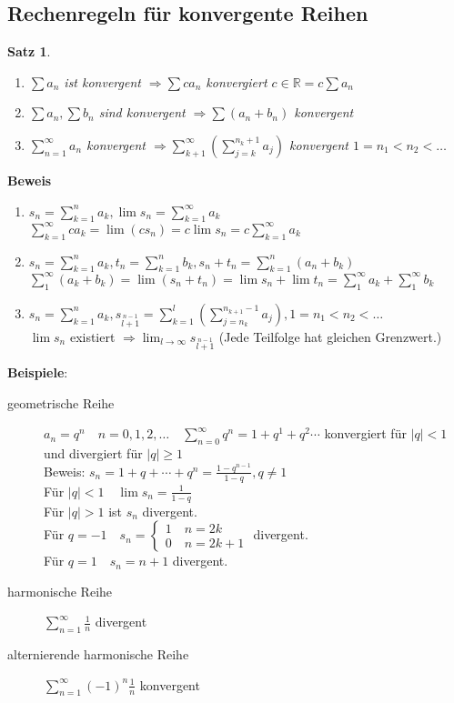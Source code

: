 \documentclass[ngerman,titlepage,twoside, parskip=half*]{scrreprt}
\newcommand*{\R}{\mathbb{R}}
\theoremstyle{plain}
\newtheorem{theorem}{Satz}[section]
\theoremstyle{definition}
\theoremstyle{remark}
\begin{document}
\subsection{Rechenregeln für konvergente Reihen}
\begin{theorem}
\label{satz:RechenregelReihe}
\begin{enumerate}[(1)]
  \item $\sum a_n$ ist konvergent $\Rightarrow \sum ca_n$ konvergiert $c\in \R =c\sum a_n$
  \item $\sum a_n, \sum b_n$ sind konvergent $\Rightarrow \sum(a_n+b_n)$ konvergent
  \item $\sum_{n=1}^\infty a_n$ konvergent $\Rightarrow \sum_{k+1}^\infty (\sum_{j=k}^{n_k+1} a_j)$ konvergent $1=n_1<n_2<\ldots$
\end{enumerate}
\end{theorem}
\textbf{Beweis}
\begin{enumerate}[(1)]
  \item $s_n=\sum_{k=1}^n a_k, \lim s_n=\sum_{k=1}^\infty a_k$\\
    $\sum_{k=1}^\infty ca_k =\lim(cs_n)=c\lim s_n =c\sum_{k=1}^\infty a_k$
  \item $s_n=\sum_{k=1}^n a_k, t_n=\sum_{k=1}^n b_k, s_n+t_n=\sum_{k=1}^n (a_n+ b_k)$\\
    $\sum_1^\infty (a_k+b_k)=\lim (s_n+t_n)=\lim s_n +\lim t_n=\sum_1^\infty a_k +\sum_1^\infty b_k$
  \item $s_n=\sum_{k=1}^n a_k, s_{\stackrel{n-1}{l+1}}=\sum_{k=1}^l(\sum_{j=n_k}^{n_{k+1}-1} a_j), 1=n_1<n_2<\ldots$\\
    $\lim s_n$ existiert $\Rightarrow \lim_{l\rightarrow \infty}
    s_{\stackrel{n-1}{l+1}}$ (Jede Teilfolge hat gleichen Grenzwert.)
\end{enumerate}
\textbf{Beispiele}:
\begin{description}
  \item[geometrische Reihe] $a_n=q^n \quad n=0,1,2,\ldots \quad \sum_{n=0}^\infty q^n=1+q^1+q^2\cdots$
    kon\-ver\-giert für $|q|<1$ und divergiert für $|q|\geq 1$\\
    Beweis: $s_n =1+q+\cdots +q^n=\frac{1-q^{n-1}}{1-q}, q\neq 1$\\
    Für $|q|<1 \quad \lim s_n=\frac{1}{1-q}$\\
    Für $|q|>1$ ist $s_n$ divergent.\\
    Für $q=-1 \quad s_n=\begin{cases}1 \quad n=2k\\0 \quad n=2k+1\end{cases}$ divergent.\\
    Für $q=1 \quad s_n=n+1$ divergent.
  \item[harmonische Reihe] $\sum_{n=1}^\infty \frac{1}{n}$ divergent
  \item[alternierende harmonische Reihe]  $\sum_{n=1}^\infty (-1)^n\frac{1}{n}$ konvergent
\end{description}
\end{document}
